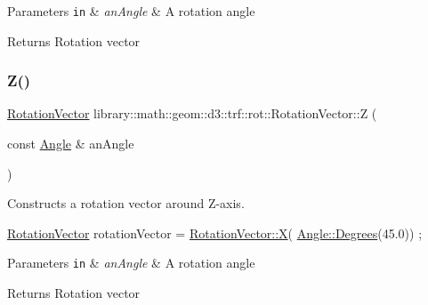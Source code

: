 \begin{DoxyParams}[1]{Parameters}
\mbox{\tt in}  & {\em an\+Angle} & A rotation angle \\
\hline
\end{DoxyParams}
\begin{DoxyReturn}{Returns}
Rotation vector 
\end{DoxyReturn}
\mbox{\label{classlibrary_1_1math_1_1geom_1_1d3_1_1trf_1_1rot_1_1_rotation_vector_a237e163d88d5c80ee8dcb3a6c68e0e4b}} 
\subsubsection{\texorpdfstring{Z()}{Z()}}
{\footnotesize\ttfamily \hyperlink{classlibrary_1_1math_1_1geom_1_1d3_1_1trf_1_1rot_1_1_rotation_vector}{Rotation\+Vector} library\+::math\+::geom\+::d3\+::trf\+::rot\+::\+Rotation\+Vector\+::Z (\begin{DoxyParamCaption}\item[{const \hyperlink{classlibrary_1_1math_1_1geom_1_1_angle}{Angle} \&}]{an\+Angle }\end{DoxyParamCaption})\hspace{0.3cm}{\ttfamily [static]}}



Constructs a rotation vector around Z-\/axis. 


\begin{DoxyCode}
\hyperlink{classlibrary_1_1math_1_1geom_1_1d3_1_1trf_1_1rot_1_1_rotation_vector_a49076a279f457fdb14c4a9d4d61e1738}{RotationVector} rotationVector = \hyperlink{classlibrary_1_1math_1_1geom_1_1d3_1_1trf_1_1rot_1_1_rotation_vector_a6b4cb091dd380a071faa158cbdd1b7ea}{RotationVector::X}(
      \hyperlink{classlibrary_1_1math_1_1geom_1_1_angle_a64aa53e8420aeb6f671d86c65c370bc8}{Angle::Degrees}(45.0)) ;
\end{DoxyCode}



\begin{DoxyParams}[1]{Parameters}
\mbox{\tt in}  & {\em an\+Angle} & A rotation angle \\
\hline
\end{DoxyParams}
\begin{DoxyReturn}{Returns}
Rotation vector 
\end{DoxyReturn}


